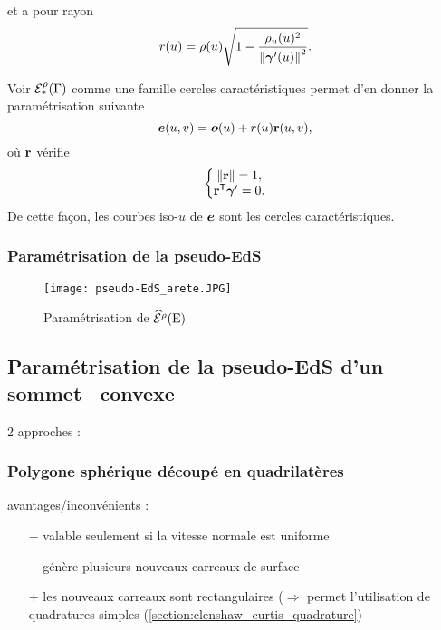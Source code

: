 et a pour rayon
\begin{equation}
    r(u) = \rho(u) \sqrt{1 - \frac{\rho_u(u)^2}{\left\| {\boldsymbol{\gamma}'(u)} \right\|^2}}.
    \label{eq:cercle_caracteristique_rayon}
\end{equation}
\par
Voir ${\mathcal{E}}_{*}^{\rho}({\Gamma})$ comme une famille cercles caractéristiques permet d'en donner la paramétrisation suivante
\begin{equation}
    \boldsymbol{e}(u,v) = \boldsymbol{o}(u) + r(u)\mathbf{r}(u,v),
    \label{eq:parametrisation_EdS_propre_courbe}
\end{equation}
où $\mathbf{r}$ vérifie
\begin{equation}
	\left\{
		\begin{matrix}
			\left\| {\mathbf{r}} \right\| = 1,\\ 
			{\mathbf{r}} ^\mathsf{T} {\boldsymbol{\gamma}'} = 0.
		\end{matrix}
	\right.
\end{equation}
De cette façon, les courbes iso-$u$ de $\boldsymbol{e}$ sont les cercles caractéristiques.


\subsubsection{Paramétrisation de la pseudo-EdS}
\label{section:parametrisation_pseudo_EdS_arete}
\newcommand{\eosR}{\lo{\vit{\eos}}}
\newcommand{\eosL}{\hi{\vit{\eos}}}

\newcommand{\psiR}{\lo{\vit{\psi}}}
\newcommand{\psiL}{\hi{\vit{\psi}}}


\begin{figure}
    \centering
    \texttt{[image: pseudo-EdS\_arete.JPG]}
    \caption{Paramétrisation de $\widehat{\mathcal{E}}^{\rho}({\mathrm{E}})$}
    \label{fig:pseudo-EdS_arete}
\end{figure}






\subsection{Paramétrisation de la pseudo-EdS d'un sommet \brep\ convexe}
2 approches :

\subsubsection{Polygone sphérique découpé en quadrilatères}
\label{section:quadrangulation_polygone_spherique}
avantages/inconvénients :
\begin{itemize}
	\item[$-$] valable seulement si la vitesse normale est uniforme
	\item[$-$] génère plusieurs nouveaux carreaux de surface
	\item[$+$] les nouveaux carreaux sont rectangulaires ($\Rightarrow$ permet l'utilisation de quadratures simples (\cf \autoref{section:clenshaw_curtis_quadrature})
\end{itemize}


